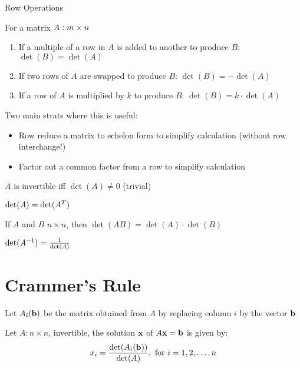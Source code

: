 \documentclass{report}
\begin{document}
\begin{theorem}Row Operations
\begin{tcolorbox}[colback=blue!5!white, colframe=blue!75!black]
For a matrix $A: m \times n$
\begin{enumerate}[label=\alph*.]
    \item If a multiple of a row in $A$ is added to another to produce $B$: $\det(B) = \det(A)$
    \item If two rows of $A$ are swapped to produce $B$: $\det(B) = -\det(A)$
    \item If a row of $A$ is multiplied by $k$ to produce $B$: $\det(B) = k \cdot \det(A)$
\end{enumerate}
\end{tcolorbox}
\end{theorem}
Two main strats where this is useful:
\begin{itemize}
    \item Row reduce a matrix to echelon form to simplify calculation (without row interchange!)
    \item Factor out a common factor from a row to simplify calculation 
\end{itemize}

\begin{theorem}
    $A$ is invertible iff $\det(A) \ne 0$ (trivial)
\end{theorem}

\begin{theorem}
    $\det(A) = \det(A^{T})$
\end{theorem}

\begin{theorem}
    If $A$ and $B$ $n \times n$, then $\det(AB) = \det(A) \cdot \det(B)$
\end{theorem}

\begin{lemma}
    $\det(A^{-1}) = \frac{1}{\det(A)}$
\end{lemma}

\section{Crammer's Rule}
Let $A_i(\mathbf{b})$ be the matrix obtained from $A$ by replacing column $i$ by the vector $\mathbf{b}$

\begin{theorem}
    Let $A: n \times n$, invertible, the solution $\mathbf{x}$ of $A\mathbf{x} = \mathbf{b}$ is given by: \[
    x_i = \frac{\det(A_i(\mathbf{b}))}{\det(A)}, \text{   for }i = 1, 2, \ldots, n
    \]
\end{theorem}
\end{document}
